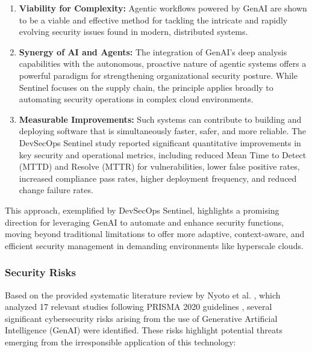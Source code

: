 \begin{enumerate}
    \item \textbf{Viability for Complexity:} Agentic workflows powered by GenAI are shown to be a viable and effective method for tackling the intricate and rapidly evolving security issues found in modern, distributed systems\cite{noauthor_devsecops_nodate}.
    \item \textbf{Synergy of AI and Agents:} The integration of GenAI's deep analysis capabilities with the autonomous, proactive nature of agentic systems offers a powerful paradigm for strengthening organizational security posture\cite{noauthor_devsecops_nodate}. While Sentinel focuses on the supply chain, the principle applies broadly to automating security operations in complex cloud environments.
    \item \textbf{Measurable Improvements:} Such systems can contribute to building and deploying software that is simultaneously faster, safer, and more reliable. The DevSecOps Sentinel study reported significant quantitative improvements in key security and operational metrics, including reduced Mean Time to Detect (MTTD) and Resolve (MTTR) for vulnerabilities, lower false positive rates, increased compliance pass rates, higher deployment frequency, and reduced change failure rates\cite{noauthor_devsecops_nodate}.
\end{enumerate}

This approach, exemplified by DevSecOps Sentinel, highlights a promising direction for leveraging GenAI to automate and enhance security functions, moving beyond traditional limitations to offer more adaptive, context-aware, and efficient security management in demanding environments like hyperscale clouds.


\subsubsection{Security Risks} %
\label{sec:Security Risks}

Based on the provided systematic literature review by Nyoto et al. \cite{nyoto_cyber_2024}, which analyzed 17 relevant studies following PRISMA 2020 guidelines \cite{page_prisma_2021}, several significant cybersecurity risks arising from the use of Generative Artificial Intelligence (GenAI) were identified. These risks highlight potential threats emerging from the irresponsible application of this technology:


